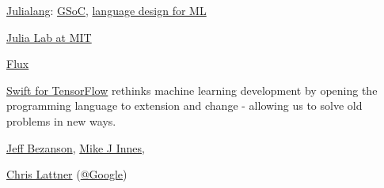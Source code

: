 \href{https://julialang.org}{Julialang}: \href{https://julialang.org/soc/ideas-page}{GSoC},
\href{https://julialang.org/blog/2017/12/ml&pl}{language design for ML}

\href{https://julia.mit.edu/}{Julia Lab at MIT}

\href{https://github.com/FluxML}{Flux}

\href{https://github.com/tensorflow/swift}{Swift for TensorFlow} rethinks machine learning development by opening the programming language to extension and change - allowing us to solve old problems in new ways. 

\href{https://github.com/JeffBezanson}{Jeff Bezanson},
\href{https://github.com/MikeInnes/}{Mike J Innes},

\href{http://nondot.org/~sabre/}{Chris Lattner} (\href{http://nondot.org/sabre/Resume.html#Google}{@Google})